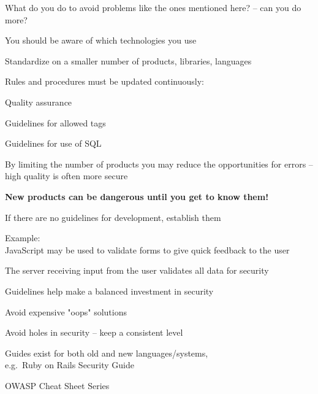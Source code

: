 \documentclass[Screen16to9,17pt]{foils}
\begin{document}
\begin{list1}
\item What do you do to avoid problems like the ones mentioned here?
-- can you do more?
\item You should be aware of which technologies you use
\item Standardize on a smaller number of products, libraries, languages
\item Rules and procedures must be updated continuously:
\begin{list2}
\item Quality assurance
\item Guidelines for allowed tags
\item Guidelines for use of SQL
\end{list2}
\item By limiting the number of products you may reduce the opportunities for errors -- high quality is often more secure
\item {\bf New products can be dangerous until you get to know them!}
\end{list1}


\begin{list2}
\item If there are no guidelines for development, establish them
\item Example:\\
JavaScript may be used to validate forms to give quick feedback to the user
\item The server receiving input from the user validates all data for security
\item Guidelines help make a balanced investment in security
\item Avoid expensive "oops" solutions
\item Avoid holes in security -- keep a consistent level
\item Guides exist for both old and new languages/systems,\\
e.g.\ Ruby on Rails Security Guide\\
\item OWASP Cheat Sheet Series\\
\end{list2}


\end{document}
